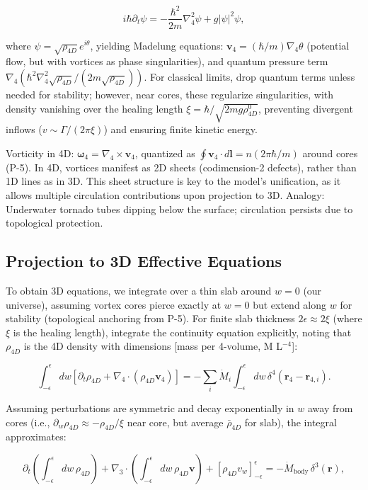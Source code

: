 \[
i \hbar \partial_t \psi = -\frac{\hbar^2}{2 m} \nabla_4^2 \psi + g |\psi|^2 \psi,
\]

where $\psi = \sqrt{\rho_{4D}} e^{i \theta}$, yielding Madelung equations: $\mathbf{v}_4 = (\hbar / m) \nabla_4 \theta$ (potential flow, but with vortices as phase singularities), and quantum pressure term $\nabla_4 (\hbar^2 \nabla_4^2 \sqrt{\rho_{4D}} / (2 m \sqrt{\rho_{4D}}))$. For classical limits, drop quantum terms unless needed for stability; however, near cores, these regularize singularities, with density vanishing over the healing length $\xi = \hbar / \sqrt{2 m g \rho_{4D}^0}$, preventing divergent inflows ($v \sim \Gamma / (2\pi \xi)$) and ensuring finite kinetic energy.

Vorticity in 4D: $\boldsymbol{\omega}_4 = \nabla_4 \times \mathbf{v}_4$, quantized as $\oint \mathbf{v}_4 \cdot d\mathbf{l} = n (2\pi \hbar / m)$ around cores (P-5). In 4D, vortices manifest as 2D sheets (codimension-2 defects), rather than 1D lines as in 3D. This sheet structure is key to the model's unification, as it allows multiple circulation contributions upon projection to 3D. Analogy: Underwater tornado tubes dipping below the surface; circulation persists due to topological protection.

\subsection{Projection to 3D Effective Equations}

To obtain 3D equations, we integrate over a thin slab around $w=0$ (our universe), assuming vortex cores pierce exactly at $w=0$ but extend along $w$ for stability (topological anchoring from P-5). For finite slab thickness $2\epsilon \approx 2\xi$ (where $\xi$ is the healing length), integrate the continuity equation explicitly, noting that $\rho_{4D}$ is the 4D density with dimensions [mass per 4-volume, M L$^{-4}$]:

\[
\int_{-\epsilon}^{\epsilon} dw \left[ \partial_t \rho_{4D} + \nabla_4 \cdot (\rho_{4D} \mathbf{v}_4) \right] = -\sum_i \dot{M}_i \int_{-\epsilon}^{\epsilon} dw \, \delta^4(\mathbf{r}_4 - \mathbf{r}_{4,i}).
\]

Assuming perturbations are symmetric and decay exponentially in $w$ away from cores (i.e., $\partial_w \rho_{4D} \approx - \rho_{4D} / \xi$ near core, but average $\bar{\rho}_{4D}$ for slab), the integral approximates:

\[
\partial_t \left( \int_{-\epsilon}^{\epsilon} dw \, \rho_{4D} \right) + \nabla_3 \cdot \left( \int_{-\epsilon}^{\epsilon} dw \, \rho_{4D} \mathbf{v} \right) + [\rho_{4D} v_w]_{-\epsilon}^{\epsilon} = -\dot{M}_{\text{body}} \, \delta^3(\mathbf{r}),
\]

